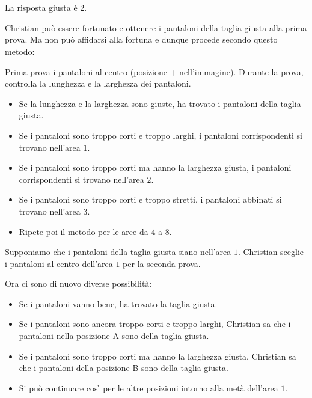 {{%
\section*{\BrochureSolution}
La risposta giusta è $2$.

Christian può essere fortunato e ottenere i pantaloni della taglia giusta alla prima prova. Ma non può affidarsi alla fortuna e dunque procede secondo questo metodo:

Prima prova i pantaloni al centro (posizione + nell’immagine). Durante la prova, controlla la lunghezza e la larghezza dei pantaloni.

\begin{itemize}
  \item Se la lunghezza e la larghezza sono giuste, ha trovato i pantaloni della taglia giusta.
  \item Se i pantaloni sono troppo corti e troppo larghi, i pantaloni corrispondenti si trovano nell’area $1$.
  \item Se i pantaloni sono troppo corti ma hanno la larghezza giusta, i pantaloni corrispondenti si trovano nell’area $2$.
  \item Se i pantaloni sono troppo corti e troppo stretti, i pantaloni abbinati si trovano nell’area $3$.
  \item Ripete poi il metodo per le aree da $4$ a $8$.
\end{itemize}

{\centering%
\par}

Supponiamo che i pantaloni della taglia giusta siano nell’area $1$. Christian sceglie i pantaloni al centro dell’area $1$ per la seconda prova.

Ora ci sono di nuovo diverse possibilità:

\begin{itemize}
  \item Se i pantaloni vanno bene, ha trovato la taglia giusta.
  \item Se i pantaloni sono ancora troppo corti e troppo larghi, Christian sa che i pantaloni nella posizione A sono della taglia giusta.
  \item Se i pantaloni sono troppo corti ma hanno la larghezza giusta, Christian sa che i pantaloni della posizione B sono della taglia giusta.
  \item Si può continuare così per le altre posizioni intorno alla metà dell’area $1$.
\end{itemize}

}}
